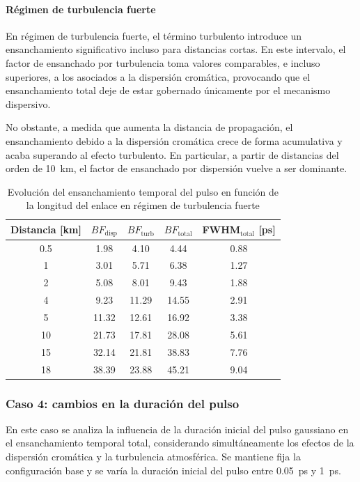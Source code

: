 \paragraph{Régimen de turbulencia fuerte}
En régimen de turbulencia fuerte, el término turbulento introduce un ensanchamiento significativo incluso para distancias cortas. En este intervalo, el factor de ensanchado por turbulencia toma valores comparables, e incluso superiores, a los asociados a la dispersión cromática, provocando que el ensanchamiento total deje de estar gobernado únicamente por el mecanismo dispersivo.

No obstante, a medida que aumenta la distancia de propagación, el ensanchamiento debido a la dispersión cromática crece de forma acumulativa y acaba superando al efecto turbulento. En particular, a partir de distancias del orden de \SI{10}{\kilo\metre}, el factor de ensanchado por dispersión vuelve a ser dominante.

\begin{table}[H]
\centering
\hspace*{-0.6cm}
\renewcommand{\arraystretch}{1.2}
\begin{tabular}{|c|c|c|c|c|}
\hline
\textbf{Distancia [km]} & \textbf{$BF_{\mathrm{disp}}$} & \textbf{$BF_{\mathrm{turb}}$} & \textbf{$BF_{\mathrm{total}}$} & \textbf{FWHM$_{\mathrm{total}}$ [ps]} \\
\hline
0.5  & 1.98  & 4.10  & 4.44  & 0.88 \\
1    & 3.01  & 5.71  & 6.38  & 1.27 \\
2    & 5.08  & 8.01  & 9.43  & 1.88 \\
4    & 9.23  & 11.29 & 14.55 & 2.91 \\
5    & 11.32 & 12.61 & 16.92 & 3.38 \\
10   & 21.73 & 17.81 & 28.08 & 5.61 \\
15   & 32.14 & 21.81 & 38.83 & 7.76 \\
18   & 38.39 & 23.88 & 45.21 & 9.04 \\
\hline
\end{tabular}
\caption{Evolución del ensanchamiento temporal del pulso en función de la longitud del enlace en régimen de turbulencia fuerte}
\end{table}

\subsubsection*{Caso 4: cambios en la duración del pulso}
En este caso se analiza la influencia de la duración inicial del pulso gaussiano en el ensanchamiento temporal total, considerando simultáneamente los efectos de la dispersión cromática y la turbulencia atmosférica. Se mantiene fija la configuración base y se varía la duración inicial del pulso entre \SI{0.05}{\pico\second} y \SI{1}{\pico\second}.

